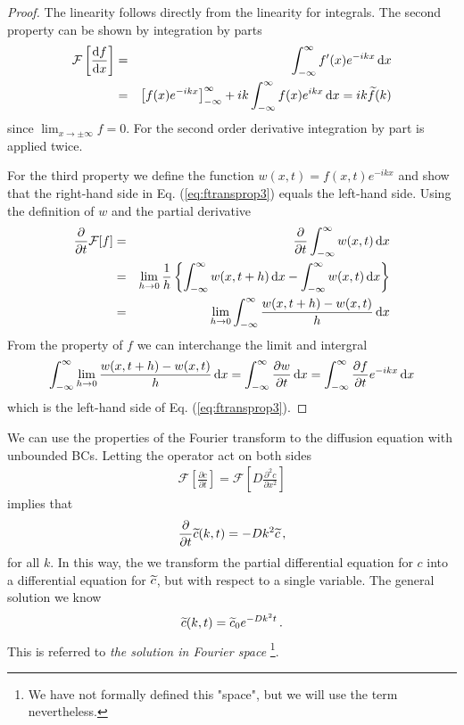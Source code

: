 \begin{proof}
	The linearity follows directly from the linearity for integrals. The second property can be shown by integration by parts 
	\begin{eqnarray}
		\mathcal{F}\left[\frac{\mathrm{d} f}{\mathrm{d} x}\right] &=& \int_{-\infty}^\infty f'(x) e^{-ikx} \, \mathrm{d} x  \nonumber \\
		&=& \left[f(x) e^{-ikx}\right]_{-\infty}^\infty + ik \int_{-\infty}^\infty f(x) e^{ikx}\, \mathrm{d} x = ik \widetilde{f}(k)
	\end{eqnarray}
	since $\lim_{x\rightarrow \pm \infty} f = 0$. For the second order derivative integration by part is applied twice.

	For the third property we define the function $w(x,t) = f(x,t)e^{-ikx}$ and show that the right-hand side in Eq. (\ref{eq:ftransprop3}) 
	equals the left-hand side. Using the definition of $w$ and the partial derivative
	\begin{eqnarray}
		\frac{\partial}{\partial t} \mathcal{F}[f] &=& \frac{\partial}{\partial t} \int_{-\infty}^\infty w(x,t) \, \mathrm{d} x \nonumber  \\ 
		&=& \lim_{h \rightarrow 0} \frac{1}{h}\left\{ \int_{-\infty}^\infty w(x, t+h) \, \mathrm{d} x - \int_{-\infty}^\infty w(x, t) \, \mathrm{d} x\right\} 
		\nonumber \\
		&=&  \lim_{h \rightarrow 0} \int_{-\infty}^\infty \frac{w(x,t+h)-w(x,t)}{h}\, \mathrm{d} x 
	\end{eqnarray}
	From the property of $f$ we can interchange the limit and intergral
	\begin{eqnarray}
		\int_{-\infty}^\infty \lim_{h \rightarrow 0} \frac{w(x,t+h)-w(x,t)}{h}\, \mathrm{d} x 
		= \int_{-\infty}^\infty \frac{\partial w}{\partial t} \, \mathrm{d} x = \int_{-\infty}^\infty \frac{\partial f}{\partial t} e^{-ik x} \, \mathrm{d} x 
	\end{eqnarray}
	which is the left-hand side of Eq. (\ref{eq:ftransprop3}).	
\end{proof}

\noindent We can use the properties of the Fourier transform to the diffusion equation with unbounded BCs. 
Letting the operator act on both sides
\begin{eqnarray}
	\mathcal{F}\left[\frac{\partial c}{\partial t}\right] = \mathcal{F}\left[D \frac{\partial^2c}{\partial x^2}\right]
\end{eqnarray}
implies that 
\begin{eqnarray}
	\frac{\partial}{\partial t}  \widetilde{c}(k, t) = -D k^2 \widetilde{c} \, ,
\end{eqnarray}
for all $k$. In this way, the we transform the partial differential equation for $c$ 
into a differential equation for $\widetilde{c}$, but with respect to a single variable. The general solution we know 
\begin{eqnarray}
	\label{eq:fouriersol}
	\widetilde{c}(k, t) = \widetilde{c}_0 e^{-Dk^2t} \, .
\end{eqnarray}
This is referred to \emph{the solution in Fourier space} \footnote{We have not formally defined this "space", 
but we will use the term nevertheless.}. 

